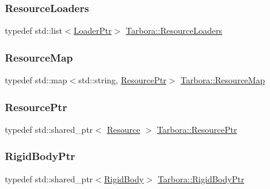 \subsubsection{\texorpdfstring{Resource\+Loaders}{ResourceLoaders}}
{\footnotesize\ttfamily typedef std\+::list$<$\hyperlink{namespaceTarbora_a9778d3976ea45923cf1d59f95972ce7f}{Loader\+Ptr}$>$ \hyperlink{namespaceTarbora_adcb77cac4f2f18382b073dd119314450}{Tarbora\+::\+Resource\+Loaders}}

\mbox{\label{namespaceTarbora_a840dcdda25851314adc29ccdc06e5ec9}} 
\subsubsection{\texorpdfstring{Resource\+Map}{ResourceMap}}
{\footnotesize\ttfamily typedef std\+::map$<$std\+::string, \hyperlink{namespaceTarbora_ae7879d11814e081a1e13e25a669c9164}{Resource\+Ptr}$>$ \hyperlink{namespaceTarbora_a840dcdda25851314adc29ccdc06e5ec9}{Tarbora\+::\+Resource\+Map}}

\mbox{\label{namespaceTarbora_ae7879d11814e081a1e13e25a669c9164}} 
\subsubsection{\texorpdfstring{Resource\+Ptr}{ResourcePtr}}
{\footnotesize\ttfamily typedef std\+::shared\+\_\+ptr$<$ \hyperlink{classTarbora_1_1Resource}{Resource} $>$ \hyperlink{namespaceTarbora_ae7879d11814e081a1e13e25a669c9164}{Tarbora\+::\+Resource\+Ptr}}

\mbox{\label{namespaceTarbora_a425b010b7a1b745d6fa83cc80f7f15b6}} 
\subsubsection{\texorpdfstring{Rigid\+Body\+Ptr}{RigidBodyPtr}}
{\footnotesize\ttfamily typedef std\+::shared\+\_\+ptr$<$\hyperlink{classTarbora_1_1RigidBody}{Rigid\+Body}$>$ \hyperlink{namespaceTarbora_a425b010b7a1b745d6fa83cc80f7f15b6}{Tarbora\+::\+Rigid\+Body\+Ptr}}

